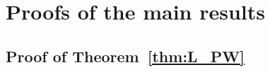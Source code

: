 \documentclass[11pt]{article}
\newcommand{\htau}{\widehat\tau}
\numberwithin{equation}{section}
\theoremstyle{definition}
\begin{document}




\section{Proofs of the main results}\label{sec:proof_main}

\subsection{Proof of Theorem~\ref{thm:L_PW}}
\end{document}
